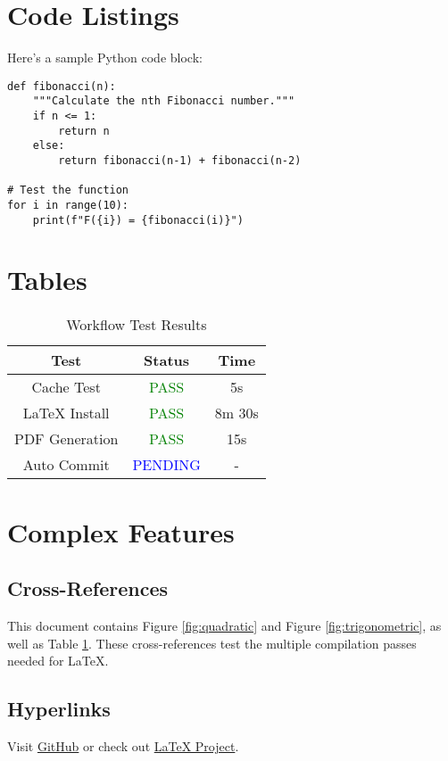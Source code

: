 \documentclass[12pt,a4paper]{article}
\begin{document}
\section{Code Listings}

Here's a sample Python code block:

\begin{lstlisting}[caption={Sample Python Code}]
def fibonacci(n):
    """Calculate the nth Fibonacci number."""
    if n <= 1:
        return n
    else:
        return fibonacci(n-1) + fibonacci(n-2)

# Test the function
for i in range(10):
    print(f"F({i}) = {fibonacci(i)}")
\end{lstlisting}

\section{Tables}

\begin{table}[h]
\centering
\begin{tabular}{|c|c|c|}
\hline
\textbf{Test} & \textbf{Status} & \textbf{Time} \\
\hline
Cache Test & \textcolor{green}{PASS} & 5s \\
LaTeX Install & \textcolor{green}{PASS} & 8m 30s \\
PDF Generation & \textcolor{green}{PASS} & 15s \\
Auto Commit & \textcolor{blue}{PENDING} & - \\
\hline
\end{tabular}
\caption{Workflow Test Results}
\label{tab:results}
\end{table}

\section{Complex Features}

\subsection{Cross-References}
This document contains Figure \ref{fig:quadratic} and Figure \ref{fig:trigonometric}, as well as Table \ref{tab:results}. These cross-references test the multiple compilation passes needed for LaTeX.

\subsection{Hyperlinks}
Visit \href{https://github.com}{GitHub} or check out \href{https://www.latex-project.org/}{LaTeX Project}.
\end{document}
